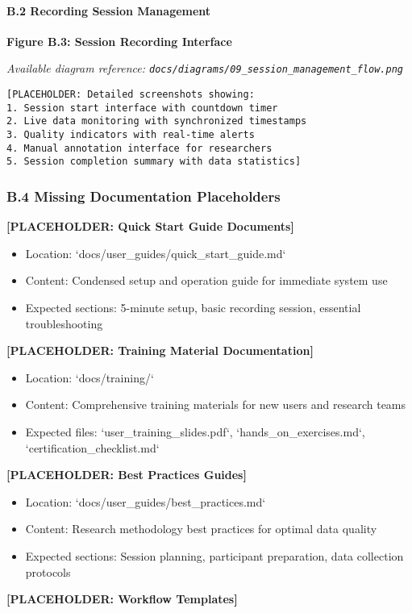 \documentclass[11pt,a4paper]{article}
\begin{document}
\paragraph{B.2 Recording Session Management}

\textbf{Figure B.3: Session Recording Interface}

\textit{Available diagram reference: \texttt{docs/diagrams/09\_session\_management\_flow.png}}

\begin{verbatim}
[PLACEHOLDER: Detailed screenshots showing:
1. Session start interface with countdown timer
2. Live data monitoring with synchronized timestamps
3. Quality indicators with real-time alerts
4. Manual annotation interface for researchers
5. Session completion summary with data statistics]
\end{verbatim}

\subsubsection{B.4 Missing Documentation Placeholders}

\textbf{[PLACEHOLDER: Quick Start Guide Documents]}

\begin{itemize}
\item Location: `docs/user_guides/quick_start_guide.md`
\item Content: Condensed setup and operation guide for immediate system use
\item Expected sections: 5-minute setup, basic recording session, essential troubleshooting

\end{itemize}
\textbf{[PLACEHOLDER: Training Material Documentation]}

\begin{itemize}
\item Location: `docs/training/`
\item Content: Comprehensive training materials for new users and research teams
\item Expected files: `user_training_slides.pdf`, `hands_on_exercises.md`, `certification_checklist.md`

\end{itemize}
\textbf{[PLACEHOLDER: Best Practices Guides]}

\begin{itemize}
\item Location: `docs/user_guides/best_practices.md`
\item Content: Research methodology best practices for optimal data quality
\item Expected sections: Session planning, participant preparation, data collection protocols

\end{itemize}
\textbf{[PLACEHOLDER: Workflow Templates]}
\end{document}
